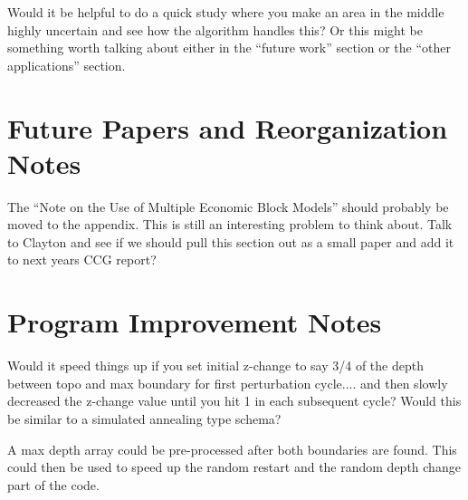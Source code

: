     Would it be helpful to do a quick study where you make an area in the middle highly uncertain and see how the algorithm handles this? Or this might be something worth talking about either in the ``future work'' section or the ``other applications'' section.

\section{Future Papers and Reorganization Notes}
    The ``Note on the Use of Multiple Economic Block Models'' should probably be moved to the appendix. This is still an interesting problem to think about. Talk to Clayton and see if we should pull this section out as a small paper and add it to next years CCG report?


\section{Program Improvement Notes}

Would it speed things up if you set initial z-change to say 3/4 of the depth between topo and max boundary for first perturbation cycle.... and then slowly decreased the z-change value until you hit 1 in each subsequent cycle? Would this be similar to a simulated annealing type schema?

A max depth array could be pre-processed after both boundaries are found. This could then be used to speed up the random restart and the random depth change part of the code.

